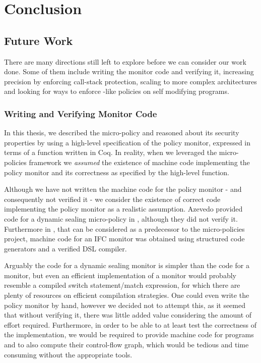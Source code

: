 \chapter{Conclusion}

\section{Future Work}

There are many directions still left to explore before we can consider
our work done. Some of them include writing the \CFI monitor code and
verifying it, increasing precision by enforcing call-stack protection,
scaling to more complex architectures and looking for ways to enforce
\CFI-like policies on self modifying programs.

\subsection{Writing and Verifying Monitor Code}

In this thesis, we described the \CFI micro-policy and reasoned about
its security properties by using a high-level specification of the
policy monitor, expressed in terms of a \TRANSFER function written in
Coq. In reality, when we leveraged the micro-policies framework we
\emph{assumed} the existence of machine code implementing the \CFI
policy monitor and its correctness as specified by the high-level
\TRANSFER function.

Although we have not written the machine code for the policy monitor -
and consequently not verified it - we consider the existence of
correct code implementing the policy monitor as a realistic
assumption. Azevedo \ETAL provided code for a dynamic sealing
micro-policy in \cite{pump_popl2015}, although they did not verify it.
Furthermore in \cite{PicoCoq2013}, that can be considered as a predecessor
to the micro-policies project, machine code for an IFC
monitor was obtained using structured code generators and a verified
DSL compiler.

Arguably the code for a dynamic sealing monitor is simpler than the
code for a \CFI monitor, but even an efficient implementation of a
\CFI monitor would probably resemble a compiled switch statement/match
expression, for which there are plenty of resources on efficient
compilation strategies. One could even write the \CFI policy monitor
by hand, however we decided not to attempt this, as it seemed that
without verifying it, there was little added value considering the
amount of effort required. Furthermore, in order to be able to at
least test the correctness of the implementation, we would be required
to provide machine code for programs and to also compute their control-flow
graph, which would be tedious and time consuming without the appropriate tools.


